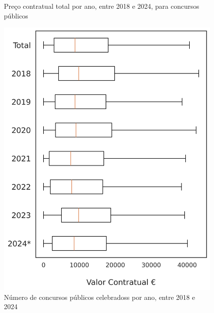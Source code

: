 \begin{figure}[H]
\begin{minipage}{.31\linewidth}
		\caption{Preço contratual total por ano, entre 2018 e 2024, para concursos públicos}
		\label{fig:precocps2}
	\end{minipage}
\end{figure}


\begin{figure}[H]
	\centering
	\begin{minipage}{.31\linewidth}
		\includegraphics[width=\linewidth]{imagens/adir_stat.png}
		\caption{Número de concursos públicos celebradoss por ano, entre 2018 e 2024}
		\label{fig:precoad}
	\end{minipage}
	\hfill
	\begin{minipage}{0.31\linewidth}

\end{minipage}
\end{figure}
